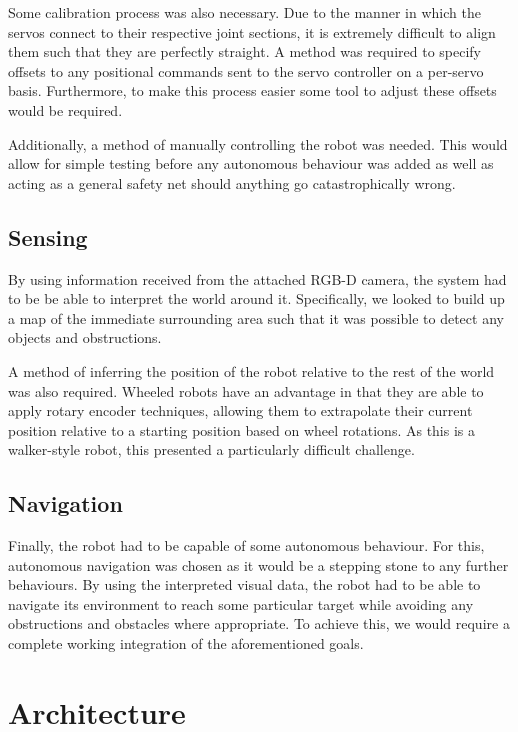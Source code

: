 Some calibration process was also necessary. Due to the manner in which the servos connect to their respective joint sections, it is extremely difficult to align them such that they are perfectly straight. A method was required to specify offsets to any positional commands sent to the servo controller on a per-servo basis. Furthermore, to make this process easier some tool to adjust these offsets would be required.

Additionally, a method of manually controlling the robot was needed. This would allow for simple testing before any autonomous behaviour was added as well as acting as a general safety net should anything go catastrophically wrong.

\subsection{Sensing}

By using information received from the attached RGB-D camera, the system had to be be able to interpret the world around it. Specifically, we looked to build up a map of the immediate surrounding area such that it was possible to detect any objects and obstructions.

A method of inferring the position of the robot relative to the rest of the world was also required. Wheeled robots have an advantage in that they are able to apply rotary encoder techniques, allowing them to extrapolate their current position relative to a starting position based on wheel rotations. As this is a walker-style robot, this presented a particularly difficult challenge.

\subsection{Navigation}

Finally, the robot had to be capable of some autonomous behaviour. For this, autonomous navigation was chosen as it would be a stepping stone to any further behaviours. By using the interpreted visual data, the robot had to be able to navigate its environment to reach some particular target while avoiding any obstructions and obstacles where appropriate. To achieve this, we would require a complete working integration of the aforementioned goals.


\section{Architecture}

